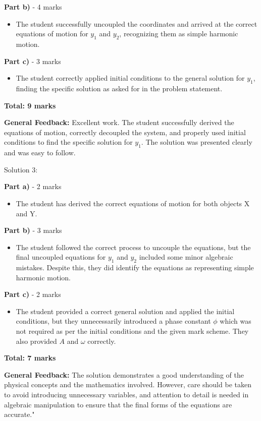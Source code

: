 \documentclass[a4paper,11pt]{article}
\begin{document}
\textbf{Part b)} - 4 marks
\begin{itemize}
    \item The student successfully uncoupled the coordinates and arrived at the correct equations of motion for \( y_{1} \) and \( y_{2} \), recognizing them as simple harmonic motion.
\end{itemize}

\textbf{Part c)} - 3 marks
\begin{itemize}
    \item The student correctly applied initial conditions to the general solution for \( y_1 \), finding the specific solution as asked for in the problem statement.
\end{itemize}

\textbf{Total: 9 marks}

\textbf{General Feedback:} Excellent work. The student successfully derived the equations of motion, correctly decoupled the system, and properly used initial conditions to find the specific solution for \( y_1 \). The solution was presented clearly and was easy to follow.

Solution 3:

\textbf{Part a)} - 2 marks
\begin{itemize}
    \item The student has derived the correct equations of motion for both objects X and Y.
\end{itemize}

\textbf{Part b)} - 3 marks
\begin{itemize}
    \item The student followed the correct process to uncouple the equations, but the final uncoupled equations for \( y_1 \) and \( y_2 \) included some minor algebraic mistakes. Despite this, they did identify the equations as representing simple harmonic motion.
\end{itemize}

\textbf{Part c)} - 2 marks
\begin{itemize}
    \item The student provided a correct general solution and applied the initial conditions, but they unnecessarily introduced a phase constant \( \phi \) which was not required as per the initial conditions and the given mark scheme. They also provided \( A \) and \( \omega \) correctly.
\end{itemize}

\textbf{Total: 7 marks}

\textbf{General Feedback:} The solution demonstrates a good understanding of the physical concepts and the mathematics involved. However, care should be taken to avoid introducing unnecessary variables, and attention to detail is needed in algebraic manipulation to ensure that the final forms of the equations are accurate."
\end{document}
